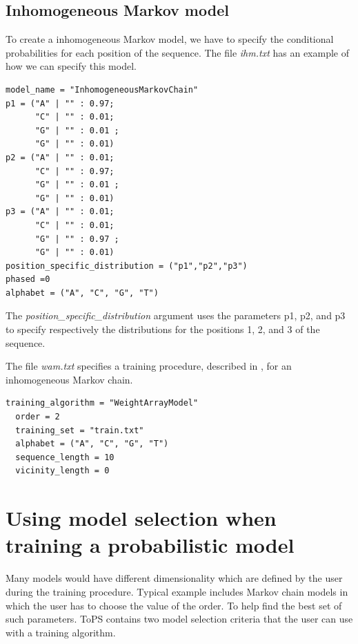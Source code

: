 \documentclass[10pt]{article}
\begin{document}
\subsection*{Inhomogeneous Markov model}

To create a inhomogeneous Markov model, we have to specify the conditional probabilities for each position of the sequence. The file \textit{ihm.txt} has  an example of how we can specify this model.

\vspace{1em}
\begin{minipage}{\textwidth}
\begin{Verbatim}[frame=single,  label={ihm.txt}]
model_name = "InhomogeneousMarkovChain"
p1 = ("A" | "" : 0.97;
      "C" | "" : 0.01;
      "G" | "" : 0.01 ;
      "G" | "" : 0.01)
p2 = ("A" | "" : 0.01;
      "C" | "" : 0.97;
      "G" | "" : 0.01 ;
      "G" | "" : 0.01)
p3 = ("A" | "" : 0.01;
      "C" | "" : 0.01;
      "G" | "" : 0.97 ;
      "G" | "" : 0.01)
position_specific_distribution = ("p1","p2","p3")
phased =0
alphabet = ("A", "C", "G", "T")
\end{Verbatim}
\end{minipage}
\vspace{1em}

The \textit{position\_specific\_distribution} argument  uses the parameters p1, p2, and p3 to specify respectively the distributions for the positions 1, 2, and 3 of the sequence.

The   file \textit{wam.txt} specifies a training procedure, described in \cite{Burge1997}, for  an inhomogeneous Markov chain.

\vspace{1em}
\begin{minipage}{\textwidth}
\begin{Verbatim}[frame=single,  label={wam.txt}]
  training_algorithm = "WeightArrayModel"
  order = 2
  training_set = "train.txt"
  alphabet = ("A", "C", "G", "T")
  sequence_length = 10
  vicinity_length = 0
\end{Verbatim}
\end{minipage}
\vspace{1em}

\section*{Using model selection when training a probabilistic model}

Many models would have different dimensionality which are defined by the user during the training procedure. Typical example includes Markov chain models in which the user has to choose the value of the order. To help find the best set of such parameters. ToPS contains two model selection criteria that the user can use with a training algorithm.
\end{document}
